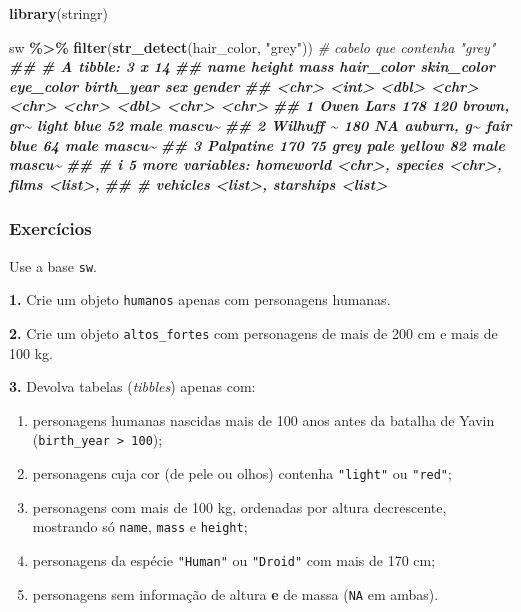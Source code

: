 \documentclass[
  portuguese,
  11pt,
  openany]{book}
\newenvironment{Shaded}{\begin{snugshade}}{\end{snugshade}}
\newcommand{\CommentTok}[1]{\textcolor[rgb]{0.56,0.35,0.01}{\textit{#1}}}
\newcommand{\DocumentationTok}[1]{\textcolor[rgb]{0.56,0.35,0.01}{\textbf{\textit{#1}}}}
\newcommand{\FunctionTok}[1]{\textcolor[rgb]{0.13,0.29,0.53}{\textbf{#1}}}
\newcommand{\NormalTok}[1]{#1}
\newcommand{\SpecialCharTok}[1]{\textcolor[rgb]{0.81,0.36,0.00}{\textbf{#1}}}
\newcommand{\StringTok}[1]{\textcolor[rgb]{0.31,0.60,0.02}{#1}}
\providecommand{\tightlist}{%
  \setlength{\itemsep}{0pt}\setlength{\parskip}{0pt}}
\begin{document}
\begin{Shaded}
\begin{Highlighting}[]
\FunctionTok{library}\NormalTok{(stringr)}

\NormalTok{sw }\SpecialCharTok{\%\textgreater{}\%} \FunctionTok{filter}\NormalTok{(}\FunctionTok{str\_detect}\NormalTok{(hair\_color, }\StringTok{"grey"}\NormalTok{))   }\CommentTok{\# cabelo que contenha "grey"}
\DocumentationTok{\#\# \# A tibble: 3 x 14}
\DocumentationTok{\#\#   name      height  mass hair\_color skin\_color eye\_color birth\_year sex   gender}
\DocumentationTok{\#\#   \textless{}chr\textgreater{}      \textless{}int\textgreater{} \textless{}dbl\textgreater{} \textless{}chr\textgreater{}      \textless{}chr\textgreater{}      \textless{}chr\textgreater{}          \textless{}dbl\textgreater{} \textless{}chr\textgreater{} \textless{}chr\textgreater{} }
\DocumentationTok{\#\# 1 Owen Lars    178   120 brown, gr\textasciitilde{} light      blue              52 male  mascu\textasciitilde{}}
\DocumentationTok{\#\# 2 Wilhuff \textasciitilde{}    180    NA auburn, g\textasciitilde{} fair       blue              64 male  mascu\textasciitilde{}}
\DocumentationTok{\#\# 3 Palpatine    170    75 grey       pale       yellow            82 male  mascu\textasciitilde{}}
\DocumentationTok{\#\# \# i 5 more variables: homeworld \textless{}chr\textgreater{}, species \textless{}chr\textgreater{}, films \textless{}list\textgreater{},}
\DocumentationTok{\#\# \#   vehicles \textless{}list\textgreater{}, starships \textless{}list\textgreater{}}
\end{Highlighting}
\end{Shaded}

\subsubsection{Exercícios}\label{exercuxedcios-17}

Use a base \texttt{sw}.

\textbf{1.} Crie um objeto \texttt{humanos} apenas com personagens humanas.

\textbf{2.} Crie um objeto \texttt{altos\_fortes} com personagens de mais de 200 cm e mais de
100 kg.

\textbf{3.} Devolva tabelas (\emph{tibbles}) apenas com:

\begin{enumerate}
\def\labelenumi{(\alph{enumi})}
\tightlist
\item
  personagens humanas nascidas mais de 100 anos antes da batalha de Yavin
  (\texttt{birth\_year\ \textgreater{}\ 100});
\item
  personagens cuja cor (de pele ou olhos) contenha \texttt{"light"} ou \texttt{"red"};
\item
  personagens com mais de 100 kg, ordenadas por altura decrescente, mostrando só
  \texttt{name}, \texttt{mass} e \texttt{height};
\item
  personagens da espécie \texttt{"Human"} ou \texttt{"Droid"} com mais de 170 cm;
\item
  personagens sem informação de altura \textbf{e} de massa (\texttt{NA} em ambas).
\end{enumerate}
\end{document}
